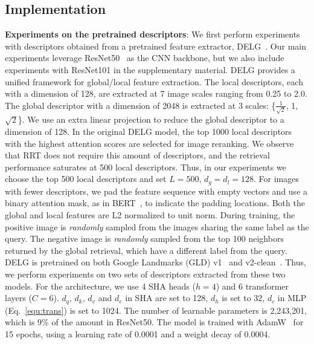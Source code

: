 \subsection{Implementation}
\label{sec:impl}
\textbf{Experiments on the pretrained descriptors}: We first perform experiments with descriptors obtained from a pretrained feature extractor, DELG~\cite{delg2020}.
Our main experiments leverage ResNet50~\cite{resnet2016} as the CNN backbone, but we also include experiments with ResNet101 in the supplementary material.
DELG provides a unified framework for global/local feature extraction. 
The local descriptors, each with a dimension of 128, are extracted at 7 image scales ranging from 0.25 to 2.0.
The global descriptor with a dimension of 2048 is extracted at 3 scales: \{$\frac{1}{\sqrt{2}}$, 1, $\sqrt{2}$\}.
We use an extra linear projection to reduce the global descriptor to a dimension of 128. 
In the original DELG model, the top 1000 local descriptors with the highest attention scores are selected for image reranking.
We observe that RRT does not require this amount of descriptors, and the retrieval performance saturates at 500 local descriptors.
Thus, in our experiments we choose the top 500 local descriptors and set $L=500$, $d_g = d_l = 128$.
For images with fewer descriptors, we pad the feature sequence with empty vectors and use a binary attention mask, as in BERT~\cite{bert2019}, to indicate the padding locations.
Both the global and local features are L2 normalized to unit norm.
During training, the positive image is \textit{randomly} sampled from the images sharing the same label as the query.
The negative image is \textit{randomly} sampled from the top 100 neighbors returned by the global retrieval, which have a different label from the query.
DELG is pretrained on both Google Landmarks (GLD) v1~\cite{delf2017} and v2-clean~\cite{gldv2}. Thus, we perform experiments on two sets of descriptors extracted from these two models. For the architecture, we use 4 SHA heads ($h=4$) and 6 transformer layers ($C=6$). $d_q$, $d_k$, $d_v$ and $d_e$ in SHA are set to 128, $d_h$ is set to 32, $d_c$ in \textsc{MLP} (Eq.~\ref{equ:trans}) is set to 1024. 
The number of learnable parameters is 2,243,201, which is 9\% of the amount in ResNet50.
The model is trained with AdamW~\cite{adamw2019} for 15 epochs, using a learning rate of 0.0001 and a weight decay of 0.0004.

